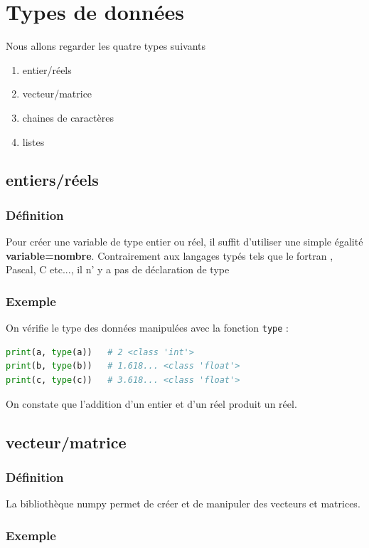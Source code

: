\documentclass[a4paper,12pt]{article}
\begin{document}
\clearpage
\section{Types de donn\'ees}
Nous allons regarder les quatre types suivants
\begin{enumerate}
\item entier/r\'eels
\item vecteur/matrice
\item chaines de caractères
\item listes
\end{enumerate}

\subsection{entiers/réels}

\subsubsection{Définition}
Pour créer une variable de type entier ou réel, il suffit d'utiliser une simple égalité \textbf{variable=nombre}.
Contrairement aux langages typés tels que le fortran , Pascal, C etc..., il n' y a pas de déclaration de type

\subsubsection{Exemple}


On vérifie le type des données manipulées avec la fonction \texttt{type} :
\begin{lstlisting}[language={Python}]
print(a, type(a))   # 2 <class 'int'>
print(b, type(b))   # 1.618... <class 'float'>
print(c, type(c))   # 3.618... <class 'float'>
\end{lstlisting}
On constate que l'addition d'un entier et d'un réel produit un réel.

\clearpage
\subsection{vecteur/matrice}
\subsubsection{Définition}
La bibliothèque numpy permet de créer et de manipuler des vecteurs et matrices.
\subsubsection{Exemple}

\end{document}
